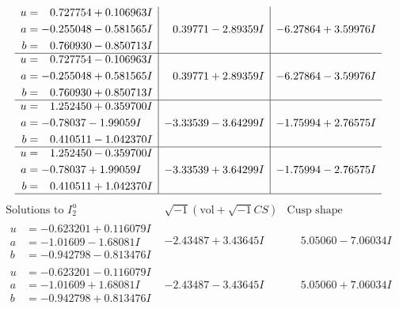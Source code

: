 \documentclass[1p]{elsarticle_modified}
\theoremstyle{definition}
\newcommand{\I}{\sqrt{-1}}
\begin{document}
$$\begin{array}{c|c|c}
\begin{aligned}
u &= \phantom{-}0.727754 + 0.106963 I \\
a &= -0.255048 - 0.581565 I \\
b &= \phantom{-}0.760930 - 0.850713 I\end{aligned}
 & \phantom{-}0.39771 - 2.89359 I & -6.27864 + 3.59976 I \\ \hline\begin{aligned}
u &= \phantom{-}0.727754 - 0.106963 I \\
a &= -0.255048 + 0.581565 I \\
b &= \phantom{-}0.760930 + 0.850713 I\end{aligned}
 & \phantom{-}0.39771 + 2.89359 I & -6.27864 - 3.59976 I \\ \hline\begin{aligned}
u &= \phantom{-}1.252450 + 0.359700 I \\
a &= -0.78037 - 1.99059 I \\
b &= \phantom{-}0.410511 - 1.042370 I\end{aligned}
 & -3.33539 - 3.64299 I & -1.75994 + 2.76575 I \\ \hline\begin{aligned}
u &= \phantom{-}1.252450 - 0.359700 I \\
a &= -0.78037 + 1.99059 I \\
b &= \phantom{-}0.410511 + 1.042370 I\end{aligned}
 & -3.33539 + 3.64299 I & -1.75994 - 2.76575 I\\
 \hline 
 \end{array}$$\newpage$$\begin{array}{c|c|c}  
\text{Solutions to }I^u_{2}& \I (\text{vol} + \sqrt{-1}CS) & \text{Cusp shape}\\
 \hline 
\begin{aligned}
u &= -0.623201 + 0.116079 I \\
a &= -1.01609 - 1.68081 I \\
b &= -0.942798 - 0.813476 I\end{aligned}
 & -2.43487 + 3.43645 I & \phantom{-}5.05060 - 7.06034 I \\ \hline\begin{aligned}
u &= -0.623201 - 0.116079 I \\
a &= -1.01609 + 1.68081 I \\
b &= -0.942798 + 0.813476 I\end{aligned}
 & -2.43487 - 3.43645 I & \phantom{-}5.05060 + 7.06034 I \\ \hline\begin{aligned}

\end{aligned}
\end{array}$$
\end{document}
